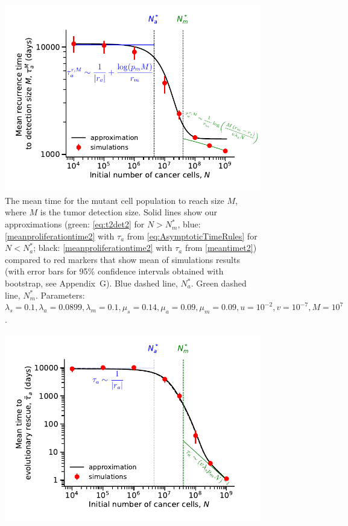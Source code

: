 \documentclass[12pt]{extarticle}
\begin{document}
\begin{appendices}
\begin{figure}
\includegraphics[width=1\textwidth]{Figures/RecurrencePlot.pdf} %
\caption{The mean time for the mutant cell population to reach size $M$, where $M$ is the tumor detection size.
Solid lines show our approximations (green: \cref{eq:t2det2} for $N>N_m^*$, blue:  \cref{meanproliferationtime2} with $\tau_a$ from \cref{eq:AsymptoticTimeRules} for $N<N_a^*$; black: \cref{meanproliferationtime2} with $\tau_a$ from \cref{meantimet2}) compared to red markers that show mean of simulations results (with error bars for 95\% confidence intervals obtained with bootstrap, see Appendix G).
Blue dashed line, $N_a^*$.
Green dashed line, $N_m^*$.
Parameters: $\lambda_s=0.1,\lambda_a=0.0899,\lambda_m=0.1,\mu_s=0.14,\mu_a=0.09,\mu_m=0.09, u=10^{-2}, v=10^{-7}, M=10^7$.}
\label{RecurrencePlot}
\end{figure}
\begin{figure}
\vspace*{1\baselineskip}
\includegraphics[width=1\textwidth]{Figures/SGVEvolutionaryRescueTimeComplete.pdf} %

\end{figure}
\end{appendices}
\end{document}
